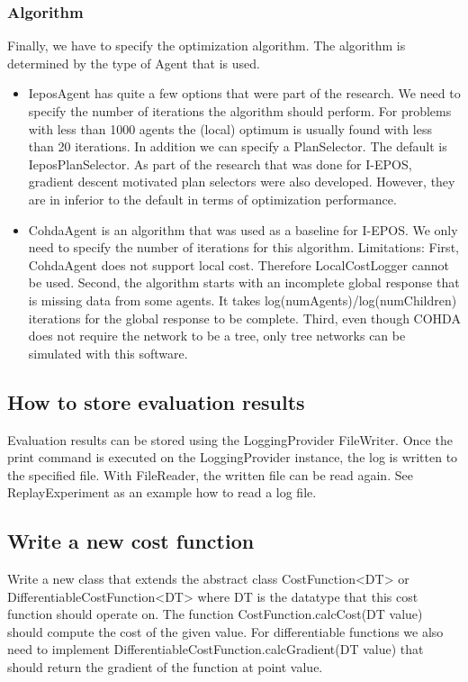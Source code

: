 \documentclass[11pt]{article} %
\newcommand{\code}{}
\begin{document}
\subsubsection*{Algorithm}
Finally, we have to specify the optimization algorithm. The algorithm is determined by the type of \code{Agent} that is used.
\begin{itemize}
	\item \code{IeposAgent} has quite a few options that were part of the research. We need to specify the number of iterations the algorithm should perform. For problems with less than 1000 agents the (local) optimum is usually found with less than 20 iterations. In addition we can specify a \code{PlanSelector}. The default is \code{IeposPlanSelector}. As part of the research that was done for I-EPOS, gradient descent motivated plan selectors were also developed. However, they are in inferior to the default in terms of optimization performance.
	\item \code{CohdaAgent} is an algorithm that was used as a baseline for I-EPOS. We only need to specify the number of iterations for this algorithm. Limitations: First, \code{CohdaAgent} does not support local cost. Therefore \code{LocalCostLogger} cannot be used. Second, the algorithm starts with an incomplete global response that is missing data from some agents. It takes \code{log(numAgents)/log(numChildren)} iterations for the global response to be complete. Third, even though COHDA does not require the network to be a tree, only tree networks can be simulated with this software.
\end{itemize}

\subsection{How to store evaluation results} \label{sec:store_results}
Evaluation results can be stored using the \code{LoggingProvider} \code{FileWriter}. Once the print command is executed on the \code{LoggingProvider} instance, the log is written to the specified file. With \code{FileReader}, the written file can be read again. See \code{ReplayExperiment} as an example how to read a log file.

\subsection{Write a new cost function} \label{sec:new_func}
Write a new class that extends the abstract class \code{CostFunction<DT>} or \code{DifferentiableCostFunction<DT>} where \code{DT} is the datatype that this cost function should operate on. The function \code{CostFunction.calcCost(DT value)} should compute the cost of the given value. For differentiable functions we also need to implement \code{DifferentiableCostFunction.calcGradient(DT value)} that should return the gradient of the function at point \code{value}.
\end{document}
